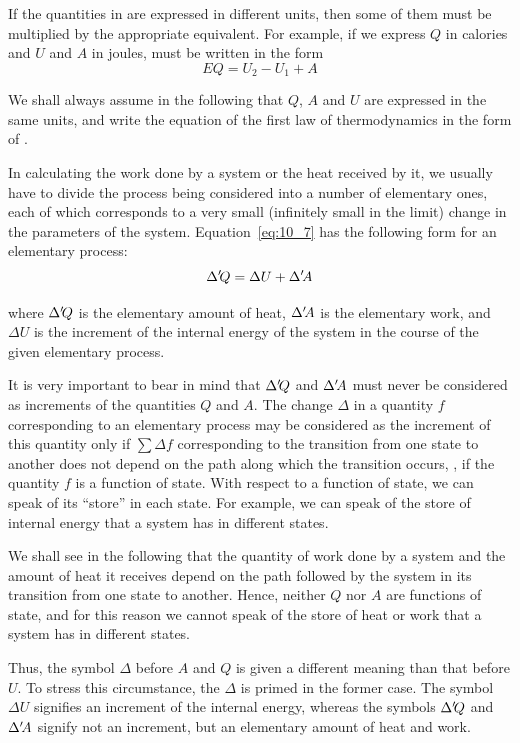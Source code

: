 If the quantities in  are expressed in different units, then some of them must be multiplied by the appropriate equivalent. For example, if we express $Q$ in calories and $U$ and $A$ in joules,  must be written in the form
\begin{equation*}
	EQ = U_2 - U_1 + A
\end{equation*}

We shall always assume in the following that $Q$, $A$ and $U$ are expressed in the same units, and write the equation of the first law of thermodynamics in the form of .

In calculating the work done by a system or the heat received by it, we usually have to divide the process being considered into a number of elementary ones, each of which corresponds to a very small (infinitely small in the limit) change in the parameters of the system. Equation~\eqref{eq:10_7} has the following form for an elementary process:
\begin{equation}\label{eq:10_8}
	\Delta'\!Q = \Delta U + \Delta'\!A
\end{equation}

\noindent
where $\Delta'\!Q$ is the elementary amount of heat, $\Delta'\!A$ is the elementary work, and $\Delta U$ is the increment of the internal energy of the system in the course of the given elementary process.

It is very important to bear in mind that $\Delta'\!Q$ and $\Delta'\!A$ must never be considered as increments of the quantities $Q$ and $A$. The change $\Delta$ in a quantity $f$ corresponding to an elementary process may be considered as the increment of this quantity only if $\sum\Delta f$ corresponding to the transition from one state to another does not depend on the path along which the transition occurs, \ie, if the quantity $f$ is a function of state. With respect to a function of state, we can speak of its ``store'' in each state. For example, we can speak of the store of internal energy that a system has in different states.

We shall see in the following that the quantity of work done by a system and the amount of heat it receives depend on the path followed by the system in its transition from one state to another. Hence, neither $Q$ nor $A$ are functions of state, and for this reason we cannot speak of the store of heat or work that a system has in different states.

Thus, the symbol $\Delta$ before $A$ and $Q$ is given a different meaning than that before $U$. To stress this circumstance, the $\Delta$ is primed in the former case. The symbol $\Delta U$ signifies an increment of the internal energy, whereas the symbols $\Delta'\!Q$ and $\Delta'\!A$ signify not an increment, but an elementary amount of heat and work.

